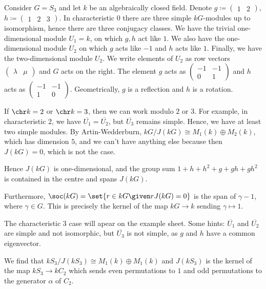 Consider $G = S_3$ and let $k$ be an algebraically closed field. Denote
$g \coloneqq \begin{pmatrix}1&2\end{pmatrix}$, $h \coloneqq \begin{pmatrix}1&2&3\end{pmatrix}$.
In characteristic $0$ there are three simple $kG$-modules up to isomorphism, hence
there are three conjugacy classes. We have the trivial one-dimensional module
$U_1 = k$, on which $g, h$ act like $1$. We also have the one-dimensional module
$U_2$ on which $g$ acts like $-1$ and $h$ acts like $1$. Finally, we have the
two-dimensional module $U_2$. We write elements of $U_2$ as row vectors
$\begin{pmatrix}\lambda&\mu\end{pmatrix}$ and $G$ acts on the right.  The element
$g$ acts as $\begin{pmatrix}-1&-1\\0&1\end{pmatrix}$ and $h$ acts as
$\begin{pmatrix}-1&-1\\1&0\end{pmatrix}$. Geometrically, $g$ is a reflection and
$h$ is a rotation.

If $\chr k = 2$ or $\chr k = 3$, then we can work modulo $2$ or $3$. For example,
in characteristic $2$, we have $\overline{U_1} = \overline{U_2}$, but $\overline{U_3}$
remains simple. Hence, we have at least two simple modules. By Artin-Wedderburn,
$kG/J(kG) \cong M_1(k)\oplus M_2(k)$, which has dimension $5$, and we can't have
anything else because then $J(kG) = 0$, which is not the case.

Hence $J(kG)$ is one-dimensional, and the group sum $1 + h + h^2 + g + gh + gh^2$ is
contained in the centre and spans $J(kG)$.

Furthermore, $\soc(kG) = \set{r \in kG\given rJ(kG) = 0}$ is the span of $\gamma  - 1$,
where $\gamma \in G$. This is precisely the kernel of the map $kG\to k$ sending
$\gamma\mapsto 1$.

The characteristic $3$ case will apear on the example sheet. Some hints:
$\overline{U_1}$ and $\overline{U_2}$ are simple and not isomorphic, but
$\overline{U_3}$ is not simple, as $g$ and $h$ have a common eigenvector.

We find that $kS_3/J(kS_3)\cong M_1(k) \oplus M_1(k)$ and
$J(kS_3)$ is the kernel of the map $kS_3\to kC_2$ which sends even permutations
to $1$ and odd permutations to the generator $\alpha$ of $C_2$.
